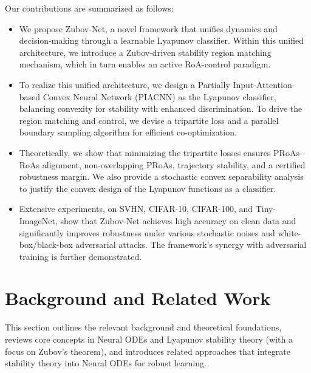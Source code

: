 \documentclass[journal]{IEEEtran}
\begin{document}
Our contributions are summarized as follows:
\begin{itemize}
	\item We propose Zubov-Net, a novel framework that unifies dynamics and decision-making through a learnable Lyapunov classifier. Within this unified architecture, we introduce a Zubov-driven stability region matching mechanism, which in turn enables an active RoA-control paradigm.
	
	\item To realize this unified architecture, we design a Partially Input-Attention-based Convex Neural Network (PIACNN) as the Lyapunov classifier, balancing convexity for stability with enhanced discrimination. To drive the region matching and control, we devise a tripartite loss and a parallel boundary sampling algorithm for efficient co-optimization.	
	
	\item Theoretically, we show that minimizing the tripartite losses ensures PRoAs-RoAs alignment, non-overlapping PRoAs, trajectory stability, and a certified robustness margin. We also provide a stochastic convex separability analysis to justify the convex design of the Lyapunov functions as a classifier.
	
	\item  Extensive experiments, on SVHN, CIFAR-10, CIFAR-100, and Tiny-ImageNet, show that Zubov-Net achieves high accuracy on clean data and significantly improves robustness under various stochastic noises and  white-box/black-box adversarial attacks. The framework's synergy with adversarial training  is further demonstrated.
\end{itemize}


\section{Background and Related Work} \label{sec:2}
This section outlines the relevant background and theoretical foundations, reviews core concepts in Neural ODEs and Lyapunov stability theory (with a focus on Zubov's theorem), and introduces related approaches that integrate stability theory into Neural ODEs for robust learning.
\end{document}
